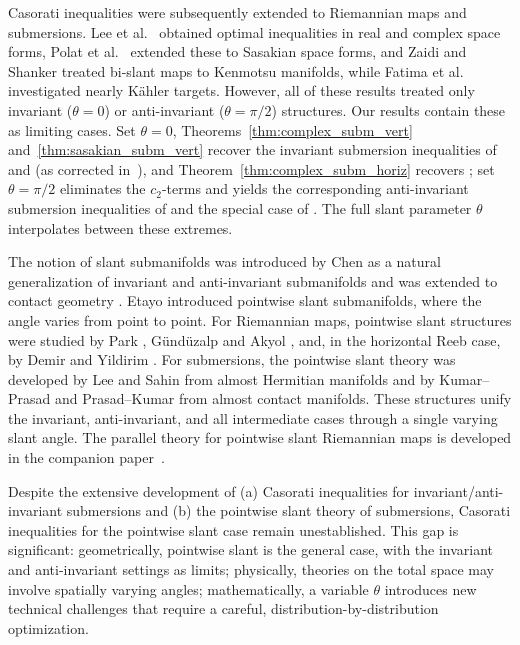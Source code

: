 \documentclass[11pt]{amsart}
\theoremstyle{plain}
\theoremstyle{definition}
\theoremstyle{remark}
\begin{document}
Casorati inequalities were subsequently extended to Riemannian maps and
submersions. Lee et al.\ \cite{Lee2021} obtained optimal inequalities in real
and complex space forms, Polat et al.\ \cite{Polat2025} extended these to
Sasakian space forms, and Zaidi and Shanker \cite{Zaidi2024} treated bi-slant
maps to Kenmotsu manifolds, while Fatima et al.\ \cite{Fatima2025} investigated
nearly K\"ahler targets. However, all of these results treated only
{invariant} ($\theta=0$) or {anti-invariant} ($\theta=\pi/2$)
structures. Our results contain these as limiting cases. Set $\theta=0$, Theorems~\ref{thm:complex_subm_vert}
and~\ref{thm:sasakian_subm_vert} recover the invariant submersion inequalities
of \cite[Theorem~4.1]{Lee2021} and \cite[Theorem~5.1]{Polat2025} (as corrected
in~\cite{Polat2025a}), and Theorem~\ref{thm:complex_subm_horiz} recovers
\cite[Theorem~4.2]{Lee2021}; set $\theta=\pi/2$ eliminates the
$c_2$-terms and yields the corresponding anti-invariant submersion inequalities of
\cite{Lee2021, Polat2025} and the special case of \cite{Zaidi2024}. The full
slant parameter $\theta$ interpolates between these extremes.

The notion of slant submanifolds was introduced by Chen \cite{Chen1990} as a
natural generalization of invariant and anti-invariant submanifolds and was
extended to contact geometry \cite{Yano1984, Blair2010}. Etayo \cite{Etayo1998}
introduced {pointwise} slant submanifolds, where the angle varies from
point to point. For Riemannian maps, pointwise slant structures were studied by
Park \cite{Park2015}, G\"und\"uzalp and Akyol \cite{GunduzalpAkyol2022}, and, in
the horizontal Reeb case, by Demir and Yildirim \cite{DemirYildirim2025}. For
submersions, the pointwise slant theory was developed by Lee and Sahin
\cite{LeeSahin2014} from almost Hermitian manifolds and by Kumar--Prasad
\cite{Kumar2020} and Prasad--Kumar \cite{Prasad2021} from almost contact
manifolds. These structures unify the invariant, anti-invariant, and all
intermediate cases through a single varying slant angle. The parallel theory for pointwise slant Riemannian maps is developed in the
companion paper~\cite{FatimaMaps}.


Despite the extensive development of (a) Casorati inequalities for
invariant/anti-invariant submersions and (b) the pointwise slant theory of
submersions, Casorati inequalities for the {pointwise slant} case remain
unestablished. This gap is significant: geometrically, pointwise slant is the
general case, with the invariant and anti-invariant settings as limits;
physically, theories on the total space may involve spatially varying angles;
mathematically, a variable $\theta$ introduces new technical challenges that
require a careful, distribution-by-distribution optimization.
\end{document}
